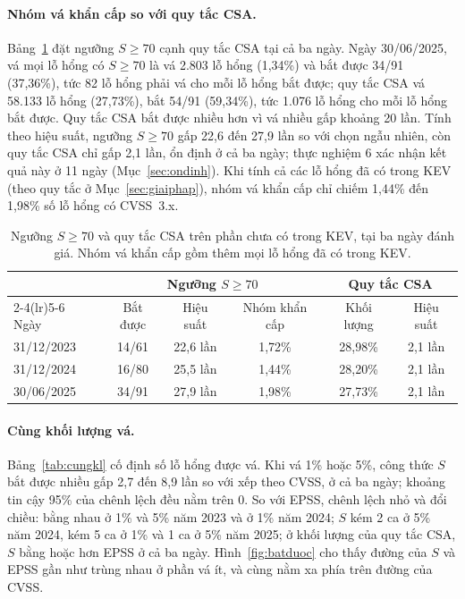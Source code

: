 \documentclass[runningheads]{llncs}
\begin{document}
\paragraph{Nhóm vá khẩn cấp so với quy tắc CSA.} Bảng~\ref{tab:khancap} đặt ngưỡng $S \ge 70$
cạnh quy tắc CSA tại cả ba ngày. Ngày 30/06/2025, vá mọi lỗ hổng có $S \ge 70$ là vá 2.803 lỗ
hổng (1,34\%) và bắt được 34/91 (37,36\%), tức 82 lỗ hổng phải vá cho mỗi lỗ hổng bắt được; quy
tắc CSA vá 58.133 lỗ hổng (27,73\%), bắt 54/91 (59,34\%), tức 1.076 lỗ hổng cho mỗi lỗ hổng bắt
được. Quy tắc CSA bắt được nhiều hơn vì vá nhiều gấp khoảng 20 lần. Tính theo hiệu suất, ngưỡng
$S \ge 70$ gấp 22,6 đến 27,9 lần so với chọn ngẫu nhiên, còn quy tắc CSA chỉ gấp 2,1 lần, ổn định ở cả ba
ngày; thực nghiệm 6 xác nhận kết quả này ở 11 ngày (Mục~\ref{sec:ondinh}). Khi tính cả các lỗ hổng đã có trong KEV (theo quy tắc ở Mục~\ref{sec:giaiphap}), nhóm vá khẩn cấp
chỉ chiếm 1,44\% đến 1,98\% số lỗ hổng có CVSS~3.x.

\begin{table}
\centering
\caption{Ngưỡng $S \ge 70$ và quy tắc CSA trên phần chưa có trong KEV, tại ba ngày đánh giá.
Nhóm vá khẩn cấp gồm thêm mọi lỗ hổng đã có trong KEV.}\label{tab:khancap}
\begin{tabular}{lccccc}
\toprule
 & \multicolumn{3}{c}{Ngưỡng $S \ge 70$} & \multicolumn{2}{c}{Quy tắc CSA} \\
\cmidrule(lr){2-4}\cmidrule(lr){5-6}
Ngày & Bắt được & Hiệu suất & Nhóm khẩn cấp & Khối lượng & Hiệu suất \\
\midrule
31/12/2023 & 14/61 & 22,6 lần & 1,72\% & 28,98\% & 2,1 lần \\
31/12/2024 & 16/80 & 25,5 lần & 1,44\% & 28,20\% & 2,1 lần \\
30/06/2025 & 34/91 & 27,9 lần & 1,98\% & 27,73\% & 2,1 lần \\
\bottomrule
\end{tabular}
\end{table}

\paragraph{Cùng khối lượng vá.} Bảng~\ref{tab:cungkl} cố định số lỗ hổng được vá. Khi vá
1\% hoặc 5\%, công thức $S$ bắt được nhiều gấp 2,7 đến 8,9 lần so với xếp theo CVSS, ở cả ba
ngày; khoảng tin cậy 95\% của chênh lệch đều nằm trên 0. So với EPSS, chênh lệch nhỏ và đổi
chiều: bằng nhau ở 1\% và 5\% năm 2023 và ở 1\% năm 2024; $S$ kém 2 ca ở 5\% năm 2024, kém 5 ca
ở 1\% và 1 ca ở 5\% năm 2025; ở khối lượng của quy tắc CSA, $S$ bằng hoặc hơn EPSS ở cả ba ngày.
Hình~\ref{fig:batduoc} cho thấy đường của $S$ và EPSS gần như trùng nhau ở phần vá ít, và cùng
nằm xa phía trên đường của CVSS.
\end{document}
